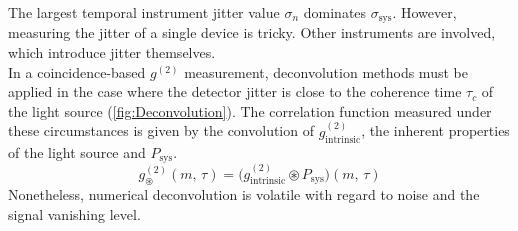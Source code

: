 The largest temporal instrument jitter value $\sigma_n$ dominates $\sigma_\mathrm{sys}$. However, measuring the jitter of a single device is tricky. Other instruments are involved, which introduce jitter themselves.\\
In a coincidence-based $g^{(2)}$ measurement, deconvolution methods must be applied in the case where the detector jitter is close to the coherence time $\tau_c$ of the light source (\cref{fig:Deconvolution}).
The correlation function measured under these circumstances is given by the convolution of $g^{(2)}_\mathrm{intrinsic}$, the inherent properties of the light source and $P_{\mathrm{sys}}$.
\begin{equation}\label{eq:g2_convolved_paper}
g^{(2)}_\mathrm{\circledast}(m,\,\tau)=\Big(g^{(2)}_\mathrm{intrinsic}\circledast P_\mathrm{sys}\Big)(m,\,\tau)
\end{equation}
Nonetheless, numerical deconvolution is volatile with regard to noise and the signal vanishing level.

